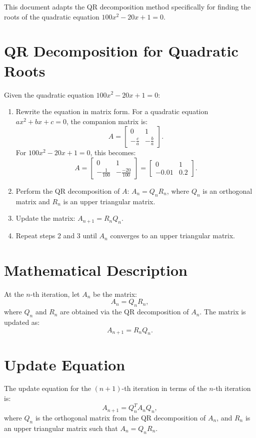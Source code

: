 \documentclass[journal]{IEEEtran}
\begin{document}
This document adapts the QR decomposition method specifically for finding the roots of the quadratic equation \( 100x^2 - 20x + 1 = 0 \).

\section*{QR Decomposition for Quadratic Roots}
Given the quadratic equation \( 100x^2 - 20x + 1 = 0 \):
\begin{enumerate}
    \item Rewrite the equation in matrix form. For a quadratic equation \( ax^2 + bx + c = 0 \), the companion matrix is:
    \[
    A = \begin{bmatrix}
    0 & 1 \\
    -\frac{c}{a} & -\frac{b}{a}
    \end{bmatrix}.
    \]
    For \( 100x^2 - 20x + 1 = 0 \), this becomes:
    \[
    A = \begin{bmatrix}
    0 & 1 \\
    -\frac{1}{100} & -\frac{-20}{100}
    \end{bmatrix} = \begin{bmatrix}
    0 & 1 \\
    -0.01 & 0.2
    \end{bmatrix}.
    \]
    \item Perform the QR decomposition of \( A \): \( A_n = Q_n R_n \), where \( Q_n \) is an orthogonal matrix and \( R_n \) is an upper triangular matrix.
    \item Update the matrix: \( A_{n+1} = R_n Q_n \).
    \item Repeat steps 2 and 3 until \( A_n \) converges to an upper triangular matrix.
\end{enumerate}

\section*{Mathematical Description}
At the \(n\)-th iteration, let \( A_n \) be the matrix:
\[
A_n = Q_n R_n,
\]
where \( Q_n \) and \( R_n \) are obtained via the QR decomposition of \( A_n \). The matrix is updated as:
\[
A_{n+1} = R_n Q_n.
\]

\section*{Update Equation}
The update equation for the \((n+1)\)-th iteration in terms of the \(n\)-th iteration is:
\[
A_{n+1} = Q_n^T A_n Q_n,
\]
where \( Q_n \) is the orthogonal matrix from the QR decomposition of \( A_n \), and \( R_n \) is an upper triangular matrix such that \( A_n = Q_n R_n \).
\end{document}
